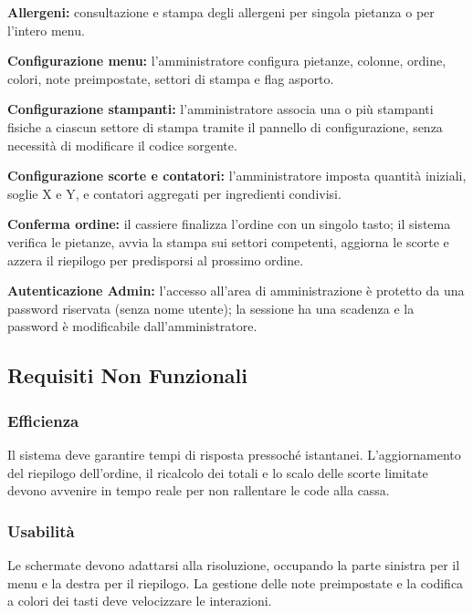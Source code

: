\begin{description}[leftmargin=2.5cm, labelwidth=2cm]
  \item[RF-07] \textbf{Allergeni:} consultazione e stampa degli allergeni per
        singola pietanza o per l'intero menu.

  \item[RF-08] \textbf{Configurazione menu:} l'amministratore configura pietanze,
        colonne, ordine, colori, note preimpostate, settori di stampa e flag
        asporto.

  \item[RF-09] \textbf{Configurazione stampanti:} l'amministratore associa una
        o più stampanti fisiche a ciascun settore di stampa tramite il pannello
        di configurazione, senza necessità di modificare il codice sorgente.

  \item[RF-10] \textbf{Configurazione scorte e contatori:} l'amministratore
        imposta quantità iniziali, soglie X e Y, e contatori aggregati per
        ingredienti condivisi.

  \item[RF-11] \textbf{Conferma ordine:} il cassiere finalizza l'ordine con un
        singolo tasto; il sistema verifica le pietanze, avvia la stampa sui
        settori competenti, aggiorna le scorte e azzera il riepilogo per
        predisporsi al prossimo ordine.

  \item[RF-12] \textbf{Autenticazione Admin:} l'accesso all'area di
        amministrazione è protetto da una password riservata (senza nome utente);
        la sessione ha una scadenza e la password è modificabile dall'amministratore.
\end{description}

\subsection{Requisiti Non Funzionali}

\subsubsection*{Efficienza}
Il sistema deve garantire tempi di risposta pressoché istantanei. L'aggiornamento
del riepilogo dell'ordine, il ricalcolo dei totali e lo scalo delle scorte limitate
devono avvenire in tempo reale per non rallentare le code alla cassa.

\subsubsection*{Usabilità}
Le schermate devono adattarsi alla risoluzione, occupando la parte sinistra per
il menu e la destra per il riepilogo. La gestione delle note preimpostate e la
codifica a colori dei tasti deve velocizzare le interazioni.

